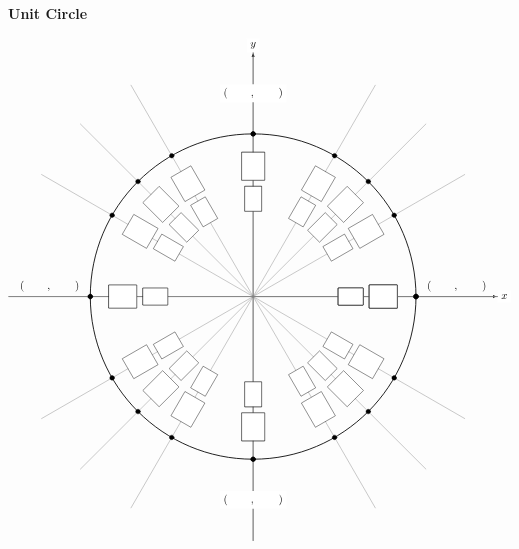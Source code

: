 \documentclass[11pt,letterpaper]{article}
\begin{document}

\begin{center} {\bfseries \huge Unit Circle} \end{center}

	\[
	\begin{tikzpicture}[scale=5.3,cap=round,>=latex]

        \draw[->] (-1.5cm ,0cm) -- (1.5cm, 0cm) node[right, fill= white] {$x$};
        \draw[->] (0cm, -1.5cm) -- (0cm, 1.5cm) node[above, fill= white] {$y$};

        \draw[thick] (0cm,0cm) circle(1cm);

        \foreach \x in {0,30,...,360} {
                \draw[gray] (0cm, 0cm) -- (\x:1.5cm);
                \filldraw[black] (\x:1cm) circle(0.4pt);
		\draw node[draw, fill= white, shape= rectangle, minimum height= 0.55cm, minimum width= 0.8cm, anchor= center, rotate= \x] at (\x:0.6cm) {};
		\draw node[draw, fill= white, shape= rectangle, minimum height= 0.75cm, minimum width= 0.9cm, anchor= center, rotate= \x] at (\x:0.8cm) {};
	}
	
	\foreach \x in {0,45,...,360} {
		\draw[gray] (0cm, 0cm) -- (\x:1.5cm);
		\filldraw[black] (\x:1cm) circle(0.4pt);
		\draw node[draw, fill= white, shape= rectangle, minimum height= 0.55cm, minimum width= 0.8cm, anchor= center, rotate= \x] at (\x:0.6cm) {};
		\draw node[draw, fill= white, shape= rectangle, minimum height= 0.75cm, minimum width= 0.9cm, anchor= center, rotate= \x] at (\x:0.8cm) {};
	}
		
        \draw (-1.25cm,0cm) node[above=1pt] {$(\hspace{.75cm},\hspace{.75cm})$}
	(1.25cm,0cm)  node[above=1pt] {$(\hspace{.75cm},\hspace{.75cm})$}
	(0cm,-1.25cm) node[fill=white] {$(\hspace{.75cm},\hspace{.75cm})$}
	(0cm,1.25cm)  node[fill=white] {$(\hspace{.75cm},\hspace{.75cm})$};


\end{tikzpicture}\]
\end{document}
